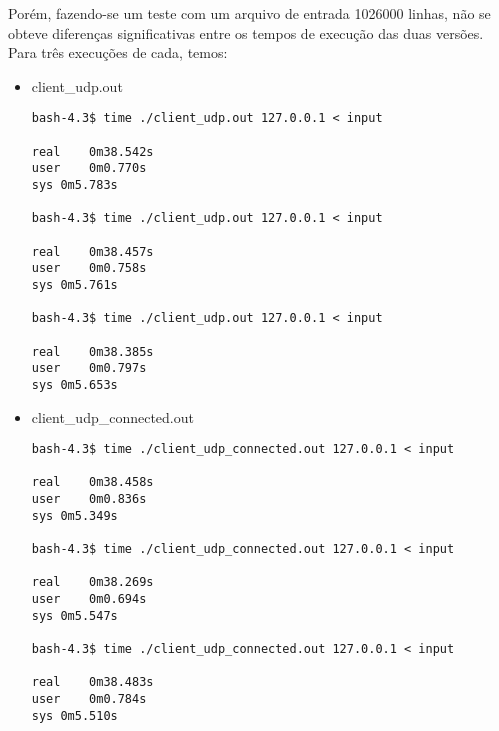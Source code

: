 \documentclass[a4paper,10pt]{article}
\begin{document}
Porém, fazendo-se um teste com um arquivo de entrada 1026000 linhas, não se obteve diferenças significativas entre os tempos de execução das duas versões. Para três execuções de cada, temos:

\begin{itemize}
\item client\_udp.out

\begin{lstlisting}
bash-4.3$ time ./client_udp.out 127.0.0.1 < input 

real	0m38.542s
user	0m0.770s
sys	0m5.783s

bash-4.3$ time ./client_udp.out 127.0.0.1 < input 

real	0m38.457s
user	0m0.758s
sys	0m5.761s

bash-4.3$ time ./client_udp.out 127.0.0.1 < input 

real	0m38.385s
user	0m0.797s
sys	0m5.653s

\end{lstlisting}

\item client\_udp\_connected.out

\begin{lstlisting}
bash-4.3$ time ./client_udp_connected.out 127.0.0.1 < input 

real	0m38.458s
user	0m0.836s
sys	0m5.349s

bash-4.3$ time ./client_udp_connected.out 127.0.0.1 < input 

real	0m38.269s
user	0m0.694s
sys	0m5.547s

bash-4.3$ time ./client_udp_connected.out 127.0.0.1 < input 

real	0m38.483s
user	0m0.784s
sys	0m5.510s

\end{lstlisting}

\end{itemize}
\end{document}
